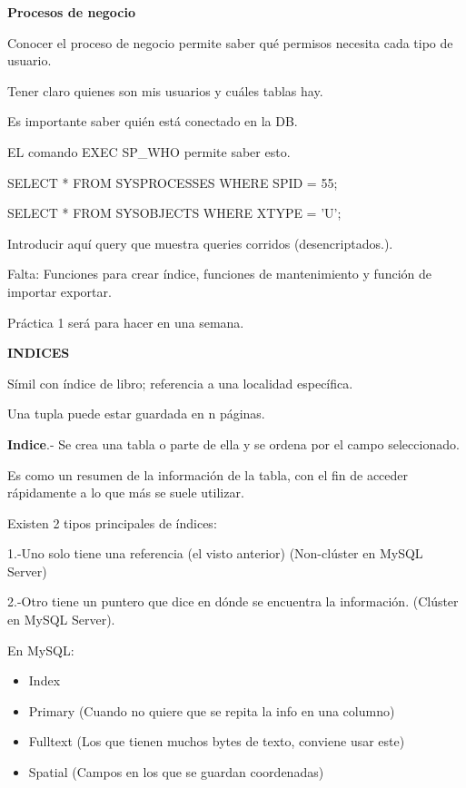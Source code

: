 \documentclass{article}
\begin{document}
\textbf{Procesos de negocio}
\vspace{1em}

Conocer el proceso de negocio permite saber qué permisos necesita cada tipo de
usuario.

Tener claro quienes son mis usuarios y cuáles tablas hay.
\vspace{1em}

Es importante saber quién está conectado en la DB.

EL comando EXEC SP\_WHO permite saber esto.

SELECT * FROM SYSPROCESSES WHERE SPID = 55;

SELECT * FROM SYSOBJECTS WHERE XTYPE = 'U';

Introducir aquí query que muestra queries corridos (desencriptados.).
\vspace{1em}

Falta: Funciones para crear índice, funciones de mantenimiento y función de
importar exportar.

\vspace{1em}
Práctica 1 será para hacer en una semana.

\vspace{1em}
\textbf{INDICES}

\vspace{1em}
Símil con índice de libro; referencia a una localidad específica.

Una tupla puede estar guardada en n páginas.

\vspace{1em}
\textbf{Indice}.- Se crea una tabla o parte de ella y se ordena por el campo seleccionado.

Es como un resumen de la información de la tabla, con el fin de acceder
rápidamente a lo que más se suele utilizar.

\vspace{1em}
Existen 2 tipos principales de índices:

\vspace{1em}
1.-Uno solo tiene una referencia (el visto anterior) (Non-clúster en MySQL Server)

2.-Otro tiene un puntero que dice en dónde se encuentra la información.
(Clúster en MySQL Server).

\vspace{1em}
En MySQL:

\begin{itemize}
	\item
	Index
	\item
	Primary (Cuando no quiere que se repita la info en una columno)
	\item
	Fulltext (Los que tienen muchos bytes de texto, conviene usar este)
	\item
	Spatial (Campos en los que se guardan coordenadas)
\end{itemize}
\end{document}
